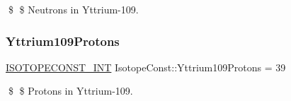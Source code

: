 \$ \$ Neutrons in Yttrium-\/109. \mbox{\label{group___isotope_const-_yttrium-_y109_ga9112e660f3e8d6615884e844a93a1e20}} 
\subsubsection{\texorpdfstring{Yttrium109\+Protons}{Yttrium109Protons}}
{\footnotesize\ttfamily \mbox{\hyperlink{group___isotope_const-_macros_ga5f18360b3e99483a35c32d789e62621c}{I\+S\+O\+T\+O\+P\+E\+C\+O\+N\+S\+T\+\_\+\+I\+NT}} Isotope\+Const\+::\+Yttrium109\+Protons = 39}

\$ \$ Protons in Yttrium-\/109. 